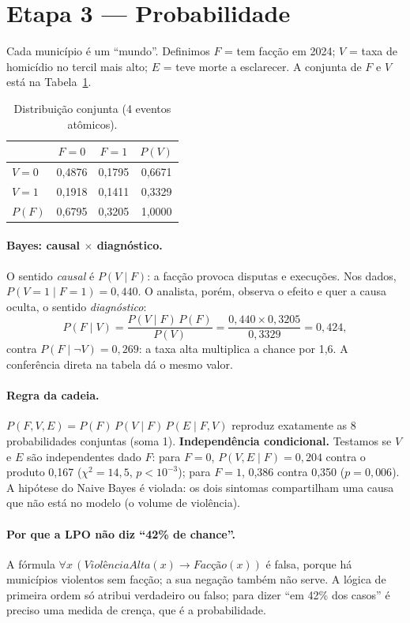 \documentclass[10pt,a4paper,twocolumn]{article}
\begin{document}
\section{Etapa 3 --- Probabilidade}

Cada município é um ``mundo''. Definimos $F$ = tem facção em 2024; $V$ = taxa de homicídio
no tercil mais alto; $E$ = teve morte a esclarecer. A conjunta de $F$ e $V$ está na
Tabela~\ref{tab:conj}.

\begin{table}[t]
\centering\small
\begin{tabular}{@{}lccc@{}}
\toprule
& $F=0$ & $F=1$ & $P(V)$\\
\midrule
$V=0$ & 0,4876 & 0,1795 & 0,6671\\
$V=1$ & 0,1918 & 0,1411 & 0,3329\\
\midrule
$P(F)$ & 0,6795 & 0,3205 & 1,0000\\
\bottomrule
\end{tabular}
\caption{Distribuição conjunta (4 eventos atômicos).}\label{tab:conj}
\end{table}

\paragraph{Bayes: causal $\times$ diagnóstico.} O sentido \emph{causal} é $P(V\mid F)$: a
facção provoca disputas e execuções. Nos dados, $P(V{=}1\mid F{=}1)=0{,}440$. O analista,
porém, observa o efeito e quer a causa oculta, o sentido \emph{diagnóstico}:
\[
P(F\mid V)=\frac{P(V\mid F)\,P(F)}{P(V)}=\frac{0{,}440\times0{,}3205}{0{,}3329}=0{,}424,
\]
contra $P(F\mid\neg V)=0{,}269$: a taxa alta multiplica a chance por 1,6. A conferência
direta na tabela dá o mesmo valor.

\paragraph{Regra da cadeia.} $P(F,V,E)=P(F)\,P(V\mid F)\,P(E\mid F,V)$ reproduz exatamente
as 8 probabilidades conjuntas (soma 1). \textbf{Independência condicional.} Testamos se $V$
e $E$ são independentes dado $F$: para $F=0$, $P(V,E\mid F)=0{,}204$ contra o produto 0,167
($\chi^2=14{,}5$, $p<10^{-3}$); para $F=1$, 0,386 contra 0,350 ($p=0{,}006$). A hipótese do
Naive Bayes é violada: os dois sintomas compartilham uma causa que não está no modelo (o
volume de violência).

\paragraph{Por que a LPO não diz ``42\% de chance''.} A fórmula
$\forall x\,(\textit{ViolênciaAlta}(x)\rightarrow\textit{Facção}(x))$ é falsa, porque há
municípios violentos sem facção; a sua negação também não serve. A lógica de primeira ordem
só atribui verdadeiro ou falso; para dizer ``em 42\% dos casos'' é preciso uma medida de
crença, que é a probabilidade.
\end{document}
